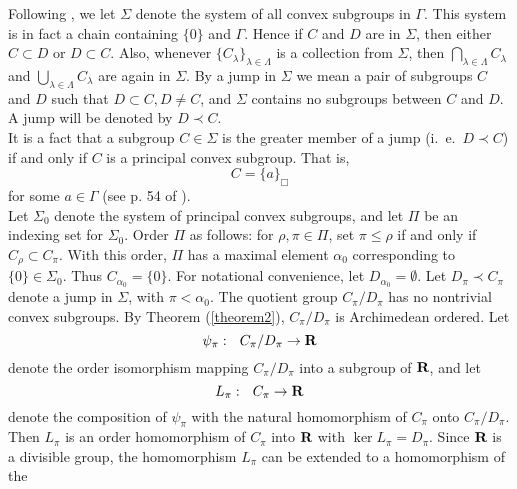 
Following \cite[Chapter IV, Section 3]{fu}, 
we let $\Sigma$ denote the system of all 
convex subgroups in $\Gamma$.  This system 
is in fact a chain containing $\{0\}$ 
and $\Gamma$.  Hence if $C$ and $D$ are in $\Sigma$, then
either $C\subset D$ or $D\subset C$.  Also,
 whenever 
$\{C_\lambda\}_{\lambda\in\Lambda}$ 
is a collection from $\Sigma$, then 
$\bigcap_{\lambda\in\Lambda}C_\lambda$ 
and 
$\bigcup_{\lambda\in\Lambda}C_\lambda$ 
are again in $\Sigma$.  By a jump in 
$\Sigma$ we mean a pair of subgroups 
$C$ and $D$ such that $D\subset C, D\neq C$, 
and $\Sigma$ contains no subgroups 
between $C$ and $D$.  A jump will be denoted by 
$D\prec C$. \\ 
It is a fact that a 
subgroup $C\in\Sigma$ is the greater 
member of a jump (i.\ e.\ $D\prec C$) if and only 
if $C$ is a principal convex subgroup.  That is,
$$C= \{a\}_\Box$$
for some $a\in \Gamma$ (see p. 54 of \cite{fu}).\\
Let 
$\Sigma_0$
denote the system of principal convex 
subgroups, and let $\Pi$ be an indexing set for 
$\Sigma_0$.  Order $\Pi$ as follows:  
for $\rho, \pi\in \Pi$, 
set 
$\pi\leq\rho$ if and only if 
$C_\rho\subset C_\pi$.  
With this order, $\Pi$ has a 
maximal element 
$\alpha_0$ 
corresponding to $\{0\}\in \Sigma_0$.
  Thus $C_{\alpha_0}=\{0\}$.
For notational convenience, let 
$D_{\alpha_0}=\emptyset$.  
Let 
$D_\pi\prec C_\pi$
denote a jump in $\Sigma$, with $\pi<\alpha_0$.  
The quotient group $C_\pi/ D_\pi$ has 
no nontrivial convex subgroups.  
By Theorem (\ref{theorem2}), $C_\pi/ D_\pi$ is 
Archimedean ordered.  Let
%
\begin{equation}
\psi_\pi :\ \  C_\pi/ D_\pi \rightarrow \R
\label{psi-sub-pi}
\end{equation}
%
denote the order isomorphism mapping $C_\pi/D_\pi$ 
into a subgroup of $\R$, and let
%
%
%
\begin{equation}
L_\pi :\ \  C_\pi \rightarrow \R
\label{L-sub-pi}
\end{equation}
%
%
%
denote the composition of $\psi_\pi$ 
with the natural homomorphism of 
$C_\pi$ onto $C_\pi/ D_\pi$.  Then $L_\pi$ 
is an order homomorphism of $C_\pi$ into 
$\R$ with $\ker L_\pi=D_\pi$.  
Since $\R$ is a divisible group,
the homomorphism $L_\pi$
can be extended to a homomorphism of the 

